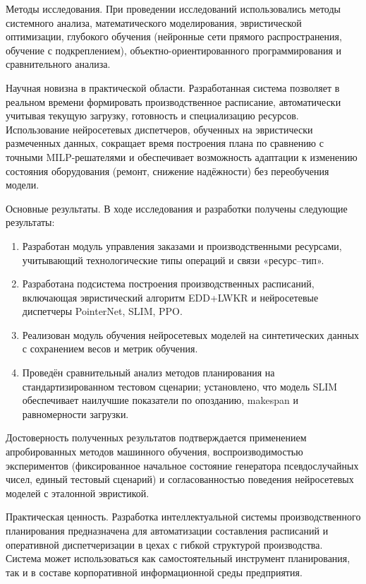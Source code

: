 Методы исследования. При проведении исследований использовались методы системного анализа, математического моделирования, эвристической оптимизации, глубокого обучения (нейронные сети прямого распространения, обучение с подкреплением), объектно-ориентированного программирования и сравнительного анализа.

Научная новизна в практической области. Разработанная система позволяет в реальном времени формировать производственное расписание, автоматически учитывая текущую загрузку, готовность и специализацию ресурсов. Использование нейросетевых диспетчеров, обученных на эвристически размеченных данных, сокращает время построения плана по сравнению с точными MILP-решателями и обеспечивает возможность адаптации к изменению состояния оборудования (ремонт, снижение надёжности) без переобучения модели.

Основные результаты. В ходе исследования и разработки получены следующие результаты:
\begin{enumerate}
    \item Разработан модуль управления заказами и производственными ресурсами, учитывающий технологические типы операций и связи «ресурс–тип».
    \item Разработана подсистема построения производственных расписаний, включающая эвристический алгоритм EDD+LWKR и нейросетевые диспетчеры PointerNet, SLIM, PPO.
    \item Реализован модуль обучения нейросетевых моделей на синтетических данных с сохранением весов и метрик обучения.
    \item Проведён сравнительный анализ методов планирования на стандартизированном тестовом сценарии; установлено, что модель SLIM обеспечивает наилучшие показатели по опозданию, makespan и равномерности загрузки.
\end{enumerate}

Достоверность полученных результатов подтверждается применением апробированных методов машинного обучения, воспроизводимостью экспериментов (фиксированное начальное состояние генератора псевдослучайных чисел, единый тестовый сценарий) и согласованностью поведения нейросетевых моделей с эталонной эвристикой.

Практическая ценность. Разработка интеллектуальной системы производственного планирования предназначена для автоматизации составления расписаний и оперативной диспетчеризации в цехах с гибкой структурой производства. Система может использоваться как самостоятельный инструмент планирования, так и в составе корпоративной информационной среды предприятия.

